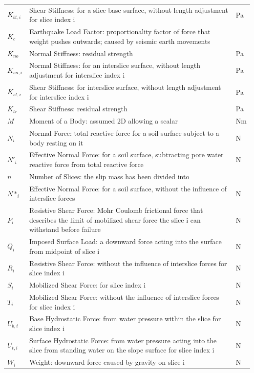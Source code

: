 \documentclass[12pt]{article}
\begin{document}
\begin{longtable*}{l l l}
$K_{bt,i}$ & Shear Stiffness: for a slice base surface, without length adjustment for slice index i & Pa
\\
$K_{c}$ & Earthquake Load Factor: proportionality factor of force that weight pushes outwards; caused by seismic earth movements & 
\\
$K_{no}$ & Normal Stiffness: residual strength & Pa
\\
$K_{sn,i}$ & Normal Stiffness: for an interslice surface, without length adjustment for interslice index i & Pa
\\
$K_{st,i}$ & Shear Stiffness: for interslice surface, without length adjustment for interslice index i & Pa
\\
$K_{tr}$ & Shear Stiffness: residual strength & Pa
\\
$M$ & Moment of a Body: assumed 2D allowing a scalar & Nm
\\
$N_{i}$ & Normal Force: total reactive force for a soil surface subject to a body resting on it & N
\\
$N'_{i}$ & Effective Normal Force: for a soil surface, subtracting pore water reactive force from total reactive force & N
\\
$n$ & Number of Slices: the slip mass has been divided into & 
\\
$N*_{i}$ & Effective Normal Force: for a soil surface, without the influence of interslice forces & N
\\
$P_{i}$ & Resistive Shear Force: Mohr Coulomb frictional force that describes the limit of mobilized shear force the slice i can withstand before failure & N
\\
$Q_{i}$ & Imposed Surface Load: a downward force acting into the surface from midpoint of slice i & N
\\
$R_{i}$ & Resistive Shear Force: without the influence of interslice forces for slice index i & N
\\
$S_{i}$ & Mobilized Shear Force: for slice index i & N
\\
$T_{i}$ & Mobilized Shear Force: without the influence of interslice forces for slice index i & N
\\
$U_{b,i}$ & Base Hydrostatic Force: from water pressure within the slice for slice index i & N
\\
$U_{t,i}$ & Surface Hydrostatic Force: from water pressure acting into the slice from standing water on the slope surface for slice index i & N
\\
$W_{i}$ & Weight: downward force caused by gravity on slice i & N
\\

\end{longtable*}
\end{document}
